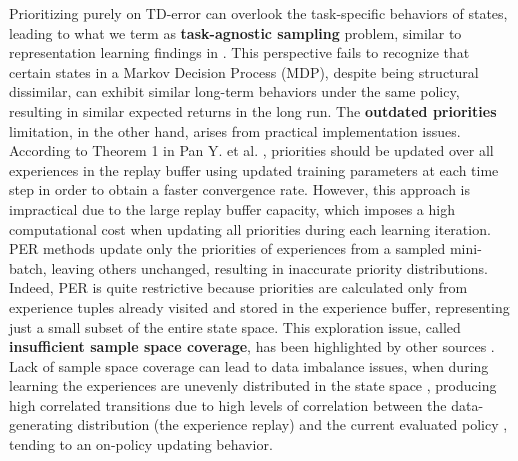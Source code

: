 Prioritizing purely on TD-error can overlook the task-specific behaviors of states, leading to what we term as \textbf{task-agnostic sampling} problem, similar to representation learning findings in \cite{zhang2020learning}. This perspective fails to recognize that certain states in a Markov Decision Process (MDP), despite being structural dissimilar, can exhibit similar long-term behaviors under the same policy, resulting in similar expected returns in the long run. The \textbf{outdated priorities} limitation, in the other hand, arises from practical implementation issues. According to Theorem 1 in Pan Y. et al. \cite{pan2022understanding}, priorities should be updated over all experiences in the replay buffer using updated training parameters at each time step in order to obtain a faster convergence rate. However, this approach is impractical due to the large replay buffer capacity, which imposes a high computational cost when updating all priorities during each learning iteration. PER \cite{schaul2015prioritized} methods update only the priorities of experiences from a sampled mini-batch, leaving others unchanged, resulting in inaccurate priority distributions. Indeed, PER is quite restrictive because priorities are calculated only from experience tuples already visited and stored in the experience buffer, representing just a small subset of the entire state space. This exploration issue, called \textbf{insufficient sample space coverage}, has been highlighted by other sources \cite{fedus2020revisiting,pan2022understanding}. Lack of sample space coverage can lead to data imbalance issues, when during learning the experiences are unevenly distributed in the state space \cite{chen2023attention}, producing high correlated transitions due to high levels of correlation between the data-generating distribution (the experience replay) and the current evaluated policy \cite{fedus2020revisiting}, tending to an on-policy updating behavior.


